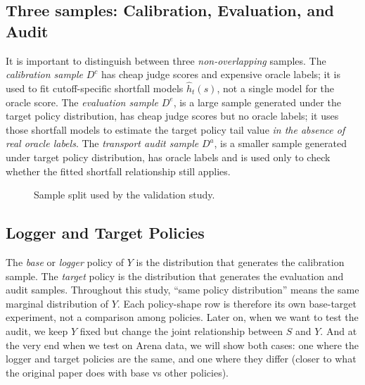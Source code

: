 \documentclass[11pt]{article}
\newcommand{\Dc}{D^{c}}
\newcommand{\De}{D^{e}}
\newcommand{\Da}{D^{a}}
\begin{document}
\subsection{Three samples: Calibration, Evaluation, and Audit}

It is important to distinguish between three \textit{non-overlapping} samples.  The \textit{calibration sample} \(\Dc\)
has cheap judge scores and expensive oracle labels; it is used to fit
cutoff-specific shortfall models \(\hat h_t(s)\), not a single model for the
oracle score.  The \textit{evaluation sample} \(\De\), is a large sample generated under the target policy distribution, has
cheap judge scores but no oracle labels; it uses those shortfall models to estimate the target policy tail
value \textit{in the absence of real oracle labels}. The \textit{transport audit sample} \(\Da\), is a smaller sample generated under target policy distribution, has oracle labels
and is used only to check whether the fitted shortfall relationship still applies. 

\begin{figure}[H]
\centering
{}
\caption{Sample split used by the validation study.}
\label{fig-split}
\end{figure}

\subsection{Logger and Target Policies}

The \textit{base} or \textit{logger} policy of $Y$ is the distribution that generates the
calibration sample.  The \textit{target} policy is the distribution that generates the
evaluation and audit samples. Throughout this study, ``same policy distribution''
means the same marginal distribution of \(Y\). Each policy-shape row is therefore its own
base-target experiment, not a comparison among policies. Later on, when we want to test the audit, we keep \(Y\) fixed but change the joint relationship between \(S\) and \(Y\). 
And at the very end when we test on Arena data, we will show both cases: one where the logger and target policies are the same, and one where they differ (closer to what the original paper does with base vs other policies).
\end{document}
